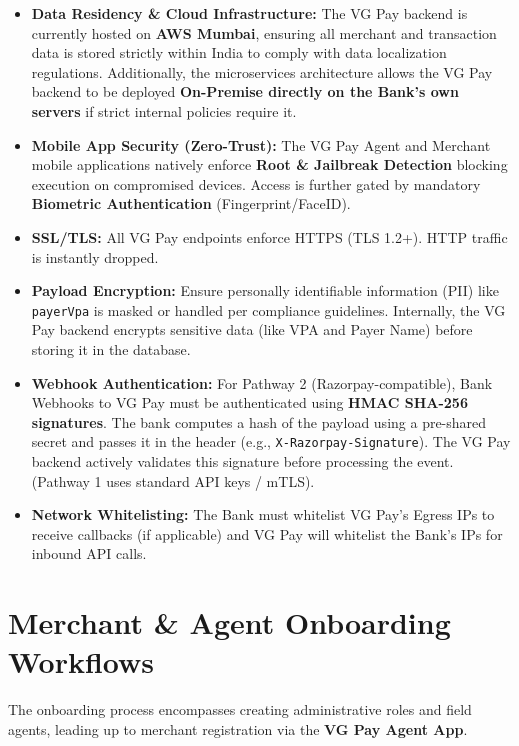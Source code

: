 \documentclass[11pt,a4paper]{article}
\begin{document}
\begin{itemize}
    \item \textbf{Data Residency \& Cloud Infrastructure:} The VG Pay backend is currently hosted on \textbf{AWS Mumbai}, ensuring all merchant and transaction data is stored strictly within India to comply with data localization regulations. Additionally, the microservices architecture allows the VG Pay backend to be deployed \textbf{On-Premise directly on the Bank's own servers} if strict internal policies require it.
    \item \textbf{Mobile App Security (Zero-Trust):} The VG Pay Agent and Merchant mobile applications natively enforce \textbf{Root \& Jailbreak Detection} blocking execution on compromised devices. Access is further gated by mandatory \textbf{Biometric Authentication} (Fingerprint/FaceID).
    \item \textbf{SSL/TLS:} All VG Pay endpoints enforce HTTPS (TLS 1.2+). HTTP traffic is instantly dropped.
    \item \textbf{Payload Encryption:} Ensure personally identifiable information (PII) like \texttt{payerVpa} is masked or handled per compliance guidelines. Internally, the VG Pay backend encrypts sensitive data (like VPA and Payer Name) before storing it in the database.
    \item \textbf{Webhook Authentication:} For Pathway 2 (Razorpay-compatible), Bank Webhooks to VG Pay must be authenticated using \textbf{HMAC SHA-256 signatures}. The bank computes a hash of the payload using a pre-shared secret and passes it in the header (e.g., \texttt{X-Razorpay\allowbreak-Signature}). The VG Pay backend actively validates this signature before processing the event. (Pathway 1 uses standard API keys / mTLS).
    \item \textbf{Network Whitelisting:} The Bank must whitelist VG Pay's Egress IPs to receive callbacks (if applicable) and VG Pay will whitelist the Bank's IPs for inbound API calls.
\end{itemize}

\section{Merchant \& Agent Onboarding Workflows}

The onboarding process encompasses creating administrative roles and field agents, leading up to merchant registration via the \textbf{VG Pay Agent App}.
\end{document}
